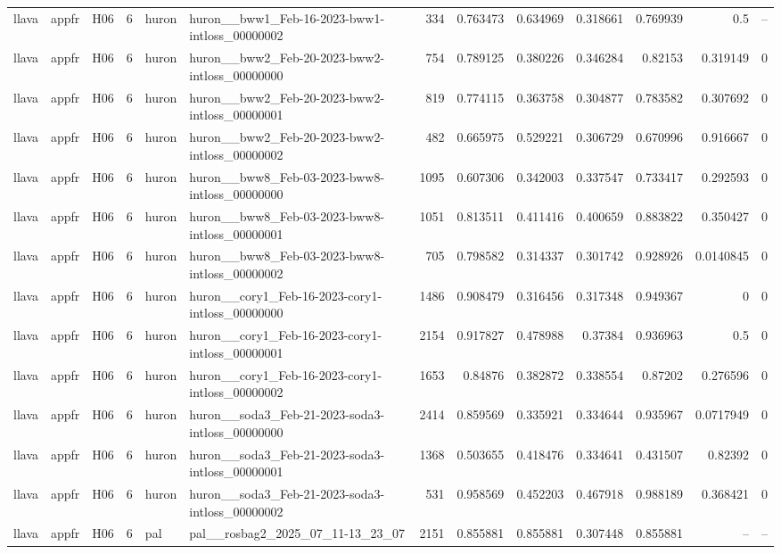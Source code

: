 \begin{longtable}{lllrllrrrrrrr}
llava & appfr & H06 & 6 & huron & huron\_\_bww1\_Feb-16-2023-bww1-intloss\_00000002 & 334 & 0.763473 & 0.634969 & 0.318661 & 0.769939 & 0.5 & -- \\
llava & appfr & H06 & 6 & huron & huron\_\_bww2\_Feb-20-2023-bww2-intloss\_00000000 & 754 & 0.789125 & 0.380226 & 0.346284 & 0.82153 & 0.319149 & 0 \\
llava & appfr & H06 & 6 & huron & huron\_\_bww2\_Feb-20-2023-bww2-intloss\_00000001 & 819 & 0.774115 & 0.363758 & 0.304877 & 0.783582 & 0.307692 & 0 \\
llava & appfr & H06 & 6 & huron & huron\_\_bww2\_Feb-20-2023-bww2-intloss\_00000002 & 482 & 0.665975 & 0.529221 & 0.306729 & 0.670996 & 0.916667 & 0 \\
llava & appfr & H06 & 6 & huron & huron\_\_bww8\_Feb-03-2023-bww8-intloss\_00000000 & 1095 & 0.607306 & 0.342003 & 0.337547 & 0.733417 & 0.292593 & 0 \\
llava & appfr & H06 & 6 & huron & huron\_\_bww8\_Feb-03-2023-bww8-intloss\_00000001 & 1051 & 0.813511 & 0.411416 & 0.400659 & 0.883822 & 0.350427 & 0 \\
llava & appfr & H06 & 6 & huron & huron\_\_bww8\_Feb-03-2023-bww8-intloss\_00000002 & 705 & 0.798582 & 0.314337 & 0.301742 & 0.928926 & 0.0140845 & 0 \\
llava & appfr & H06 & 6 & huron & huron\_\_cory1\_Feb-16-2023-cory1-intloss\_00000000 & 1486 & 0.908479 & 0.316456 & 0.317348 & 0.949367 & 0 & 0 \\
llava & appfr & H06 & 6 & huron & huron\_\_cory1\_Feb-16-2023-cory1-intloss\_00000001 & 2154 & 0.917827 & 0.478988 & 0.37384 & 0.936963 & 0.5 & 0 \\
llava & appfr & H06 & 6 & huron & huron\_\_cory1\_Feb-16-2023-cory1-intloss\_00000002 & 1653 & 0.84876 & 0.382872 & 0.338554 & 0.87202 & 0.276596 & 0 \\
llava & appfr & H06 & 6 & huron & huron\_\_soda3\_Feb-21-2023-soda3-intloss\_00000000 & 2414 & 0.859569 & 0.335921 & 0.334644 & 0.935967 & 0.0717949 & 0 \\
llava & appfr & H06 & 6 & huron & huron\_\_soda3\_Feb-21-2023-soda3-intloss\_00000001 & 1368 & 0.503655 & 0.418476 & 0.334641 & 0.431507 & 0.82392 & 0 \\
llava & appfr & H06 & 6 & huron & huron\_\_soda3\_Feb-21-2023-soda3-intloss\_00000002 & 531 & 0.958569 & 0.452203 & 0.467918 & 0.988189 & 0.368421 & 0 \\
llava & appfr & H06 & 6 & pal & pal\_\_rosbag2\_2025\_07\_11-13\_23\_07 & 2151 & 0.855881 & 0.855881 & 0.307448 & 0.855881 & -- & -- \\

\end{longtable}
